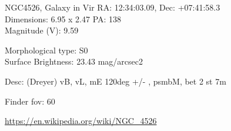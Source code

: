 \begin{block}{NGC4526, Galaxy in Vir}
    RA: 12:34:03.09, Dec: +07:41:58.3 \\ 
    Dimensions: 6.95 x 2.47 PA: 138 \\ 
    Magnitude (V): 9.59

    Morphological type: S0 \\ 
    Surface Brightness: 23.43 mag/arcsec2 

    Desc: (Dreyer) vB, vL, mE 120deg +/- , psmbM, bet 2 st 7m 

    Finder fov: 60 

    \url{https://en.wikipedia.org/wiki/NGC_4526} 
\end{block}